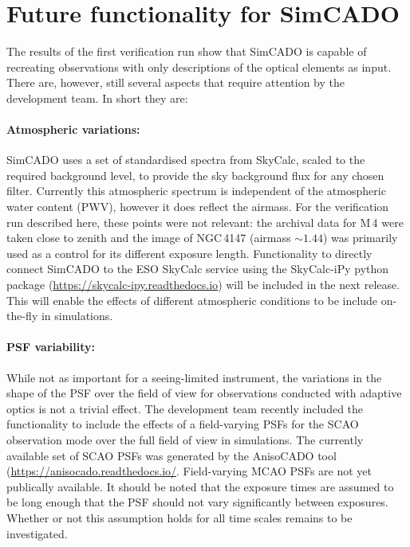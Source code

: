 \section{Future functionality for SimCADO}
\label{sec:future}

The results of the first verification run show that SimCADO is capable of recreating observations with only descriptions of the optical elements as input. There are, however, still several aspects that require attention by the development team. In short they are:

\paragraph{Atmospheric variations:} SimCADO uses a set of standardised spectra from SkyCalc, scaled to the required background level, to provide the sky background flux for any chosen filter. Currently this atmospheric spectrum is independent of the atmospheric water content (PWV), however it does reflect the airmass. For the verification run described here, these points were not relevant: the archival data for M\,4 were taken close to zenith and the image of NGC\,4147 (airmass $\sim 1.44$) was primarily used as a control for its different exposure length. Functionality to directly connect SimCADO to the ESO SkyCalc service using the SkyCalc-iPy python package (\url{https://skycalc-ipy.readthedocs.io}) will be included in the next release. This will enable the effects of different atmospheric conditions to be include on-the-fly in simulations.

\paragraph{PSF variability:} While not as important for a seeing-limited instrument, the variations in the shape of the PSF over the field of view for observations conducted with adaptive optics is not a trivial effect. The development team recently included the functionality to include the effects of a field-varying PSFs for the SCAO observation mode over the full field of view in simulations. The currently available set of SCAO PSFs was generated by the AnisoCADO tool (\url{https://anisocado.readthedocs.io/}. Field-varying MCAO PSFs are not yet publically available. It should be noted that the exposure times are assumed to be long enough that the PSF should not vary significantly between exposures. Whether or not this assumption holds for all time scales remains to be investigated.

